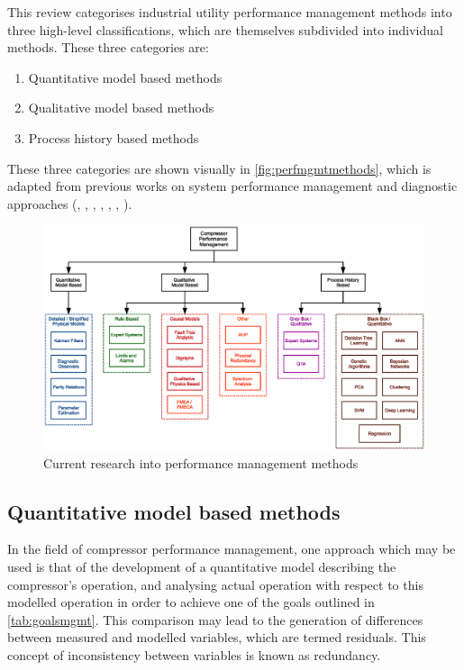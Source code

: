 This review categorises industrial utility performance management methods into three high-level classifications, which are themselves subdivided into individual methods. These three categories are:
\begin{enumerate}
\item Quantitative model based methods
\item Qualitative model based methods
\item Process history based methods
\end{enumerate}
These three categories are shown visually in \autoref{fig:perfmgmtmethods}, which is adapted from previous works on system performance management and diagnostic approaches (\cite{Katipamula2005}, \cite{Venkatasubramanian2003}, \cite{Venkatasubramanian2003a}, \cite{Venkatasubramanian2003b}, \cite{Gao2015}, \cite{Gao2015a}, \cite{Bruton2013}).


\begin{figure}
\includegraphics[width=\textwidth]{./Images/perfmgmt.eps}
\caption{Current research into performance management methods}
\label{fig:perfmgmtmethods}
\end{figure}

\subsection{Quantitative model based methods}
In the field of compressor performance management, one approach which may be used is that of the development of a quantitative model describing the compressor's operation, and analysing actual operation with respect to this modelled operation in order to achieve one of the goals outlined in \autoref{tab:goalsmgmt}. This comparison may lead to the generation of differences between measured and modelled variables, which are termed residuals. This concept of inconsistency between variables is known as redundancy.

